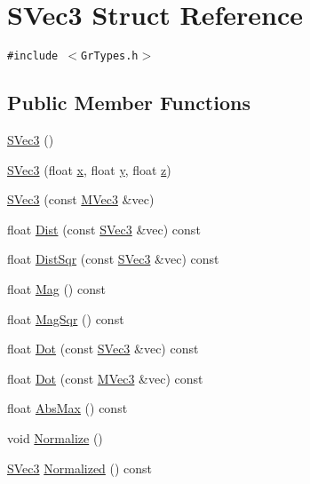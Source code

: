 \hypertarget{struct_s_vec3}{
\section{SVec3 Struct Reference}
\label{struct_s_vec3}
}
{\tt \#include $<$GrTypes.h$>$}

\subsection*{Public Member Functions}
\begin{CompactItemize}
\item 
\hyperlink{struct_s_vec3_c7b69a9f9a0f36dd127aace025c8660a}{SVec3} ()
\item 
\hyperlink{struct_s_vec3_3b9c3f6965913544d0f88d0dd4398e1d}{SVec3} (float \hyperlink{struct_s_vec3_a30ab4ca24f2b7968f6b21a97c28a812}{x}, float \hyperlink{struct_s_vec3_9e4d6ddc68169c650b437a7d1714f299}{y}, float \hyperlink{struct_s_vec3_d9d349dd9369afd5bd7d056e59b3ae4a}{z})
\item 
\hyperlink{struct_s_vec3_6b9a2eabcdf8d8044f184a1962ae5d5a}{SVec3} (const \hyperlink{class_m_vec3}{MVec3} \&vec)
\item 
float \hyperlink{struct_s_vec3_28f033f4e9073dcbe27d385e2cba1929}{Dist} (const \hyperlink{struct_s_vec3}{SVec3} \&vec) const 
\item 
float \hyperlink{struct_s_vec3_222b0f4cd0f52471ebf70dbad68dd03b}{DistSqr} (const \hyperlink{struct_s_vec3}{SVec3} \&vec) const 
\item 
float \hyperlink{struct_s_vec3_903103913dbda8f416cd4eaab7faa5f7}{Mag} () const 
\item 
float \hyperlink{struct_s_vec3_721348baa5a216e3784241336baa34f4}{MagSqr} () const 
\item 
float \hyperlink{struct_s_vec3_4f0aa544f63c27bde9e89363ca58c6a6}{Dot} (const \hyperlink{struct_s_vec3}{SVec3} \&vec) const 
\item 
float \hyperlink{struct_s_vec3_f3e9779336e5a54ecbdd254e0de35511}{Dot} (const \hyperlink{class_m_vec3}{MVec3} \&vec) const 
\item 
float \hyperlink{struct_s_vec3_250acbecacb21eda69e976bbab1866df}{AbsMax} () const 
\item 
void \hyperlink{struct_s_vec3_5b3afb295582e6c100e8a8ac931d1793}{Normalize} ()
\item 
\hyperlink{struct_s_vec3}{SVec3} \hyperlink{struct_s_vec3_cfb19f8729abb5eade96512a5153df07}{Normalized} () const 
\item 

\end{CompactItemize}
